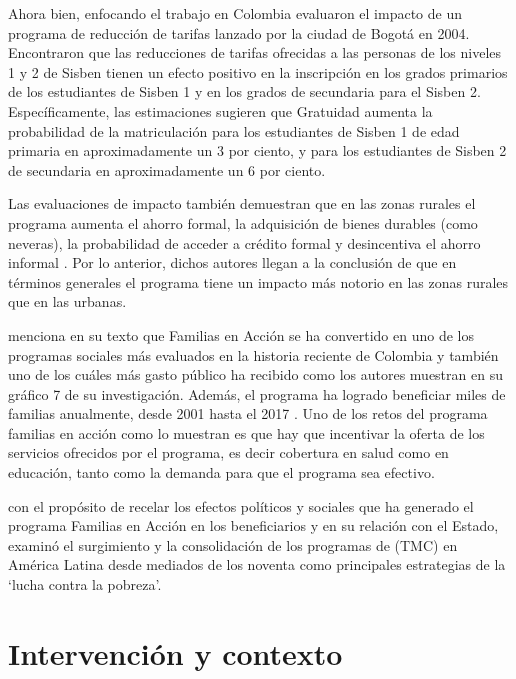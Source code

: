 \documentclass[AER]{AEA}
\begin{document}
Ahora bien, enfocando el trabajo en Colombia \cite{Barrera-Osorio2007TheQuasi-experiment} evaluaron el impacto de un programa de reducción de tarifas lanzado por la ciudad de Bogotá en 2004. Encontraron que las reducciones de tarifas ofrecidas a las personas de los niveles 1 y 2 de Sisben tienen un efecto positivo en la inscripción en los grados primarios de los estudiantes de Sisben 1 y en los grados de secundaria para el Sisben 2. Específicamente, las estimaciones sugieren que Gratuidad aumenta la probabilidad de la matriculación para los estudiantes de Sisben 1 de edad primaria en aproximadamente un 3 por ciento, y para los estudiantes de Sisben 2 de secundaria en aproximadamente un 6 por ciento.

Las evaluaciones de impacto también demuestran que en las zonas rurales el programa aumenta el ahorro formal, la adquisición de bienes durables (como neveras), la probabilidad de acceder a crédito formal y desincentiva el ahorro informal \cite{Robles2018Las2001-2018}. Por lo anterior, dichos autores llegan a la conclusión de que en términos generales el programa tiene un impacto más notorio en las zonas rurales que en las urbanas.

 \cite{Robles2018Las2001-2018} menciona en su texto que Familias en Acción se ha convertido en uno de los programas sociales más evaluados en la historia reciente de Colombia y también uno de los cuáles más gasto público ha recibido como los autores muestran en su gráfico 7 de su investigación. Además, el programa ha logrado beneficiar miles de familias anualmente, desde 2001 hasta el 2017 \citep{Robles2018Las2001-2018}. Uno de los retos del programa familias en acción como lo muestran \cite{Robles2018Las2001-2018} es que hay que incentivar la oferta de los servicios ofrecidos por el programa, es decir cobertura en salud como en educación, tanto como la demanda para que el programa sea efectivo.

\cite{PulidoBuitrago2013LosAccion} con el propósito de recelar los efectos políticos y sociales que ha generado el programa Familias en Acción en los beneficiarios y en su relación con el Estado, examinó el surgimiento y la consolidación de los programas de (TMC) en América Latina desde mediados de los noventa como principales estrategias de la ‘lucha contra la pobreza’.

\section{Intervención y contexto}
\end{document}
